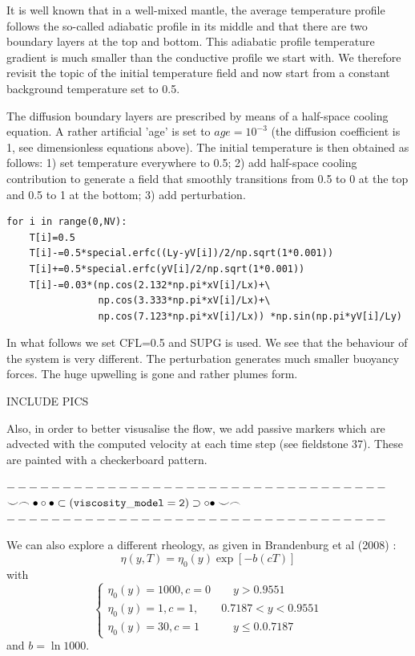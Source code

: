 It is well known that in a well-mixed mantle, the average temperature profile 
follows the so-called adiabatic profile in its middle and that there are two 
boundary layers at the top and bottom. This adiabatic profile temperature gradient 
is much smaller than the conductive profile we start with.
We therefore revisit the topic of the initial temperature field and now start 
from a constant background temperature set to 0.5. 

The diffusion boundary layers are prescribed by means of a half-space cooling equation.
A rather artificial 'age' is set to $age=10^{-3}$ (the diffusion coefficient is 1, 
see dimensionless equations above).
The initial temperature is then obtained as follows: 1) set temperature everywhere to 0.5; 
2) add half-space cooling contribution to generate a field that smoothly transitions 
from 0.5 to 0 at the top and 0.5 to 1 at the bottom; 3) add perturbation. 

\begin{lstlisting}
for i in range(0,NV):
    T[i]=0.5
    T[i]-=0.5*special.erfc((Ly-yV[i])/2/np.sqrt(1*0.001))
    T[i]+=0.5*special.erfc(yV[i]/2/np.sqrt(1*0.001))
    T[i]-=0.03*(np.cos(2.132*np.pi*xV[i]/Lx)+\
                np.cos(3.333*np.pi*xV[i]/Lx)+\
                np.cos(7.123*np.pi*xV[i]/Lx)) *np.sin(np.pi*yV[i]/Ly)
\end{lstlisting}


In what follows we set CFL=0.5 and SUPG is used.
We see that the behaviour of the system is very different. The perturbation generates 
much smaller buoyancy forces. The huge upwelling is gone and rather plumes form. 

INCLUDE PICS


Also, in order to better visusalise the flow, we add passive markers which are 
advected with the computed velocity at each time step (see fieldstone 37).
These are painted with a checkerboard pattern.



\begin{center}
$----------------------------------$\\
$\smile \frown \bullet \circ \bullet \subset ( {\tt viscosity\_model=2} ) \supset \circ \bullet \smile \frown$\\
$----------------------------------$
\end{center}

We can also explore a different rheology, as given in Brandenburg et al (2008) \cite{brhv08}:
\[
\eta(y,T) = \eta_0(y) \exp [-b(cT)]
\]
with 
\[
\left\{
\begin{array}{c}
\eta_0(y)=1000, c=0 \qquad y> 0.9551 \\
\eta_0(y)=1,    c=1, \qquad  0.7187  <y< 0.9551 \\
\eta_0(y)=30,   c=1  \qquad\quad y \le 0.0.7187
\end{array}
\right.
\]
and $b=\ln 1000$.

